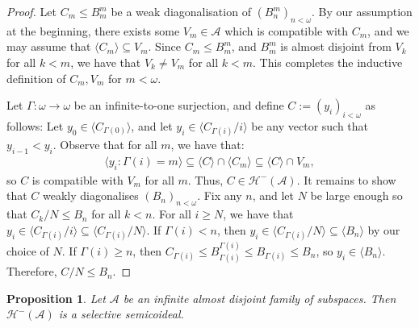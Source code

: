 \documentclass[11pt,reqno]{amsart}
\theoremstyle{plain}
\numberwithin{equation}{section}
\newtheorem{proposition}[theorem]{Proposition}
\theoremstyle{definition}
\renewcommand{\c}[1]{\langle #1 \rangle}
\newcommand{\cal}{\mathcal}
\newcommand{\A}{\cal{A}}
\renewcommand{\H}{\cal{H}}
\begin{document}
\begin{proof}
    Let $C_m \leq B_m^m$ be a weak diagonalisation of $(B_n^m)_{n<\omega}$. By our assumption at the beginning, there exists some $V_m \in \A$ which is compatible with $C_m$, and we may assume that $\c{C_m} \subseteq V_m$. Since $C_m \leq B_m^m$, and $B_m^m$ is almost disjoint from $V_k$ for all $k < m$, we have that $V_k \neq V_m$ for all $k < m$. This completes the inductive definition of $C_m,V_m$ for $m < \omega$.
    
    Let $\Gamma : \omega \to \omega$ be an infinite-to-one surjection, and define $C := (y_i)_{i<\omega}$ as follows: Let $y_0 \in \c{C_{\Gamma(0)}}$, and let $y_i \in \c{C_{\Gamma(i)}/i}$ be any vector such that $y_{i-1} < y_i$. Observe that for all $m$, we have that:
    \begin{align*}
        \c{y_i : \Gamma(i) = m} \subseteq \c{C} \cap \c{C_m} \subseteq \c{C} \cap V_m,
    \end{align*}
    so $C$ is compatible with $V_m$ for all $m$. Thus, $C \in \H^-(\A)$. It remains to show that $C$ weakly diagonalises $(B_n)_{n<\omega}$. Fix any $n$, and let $N$ be large enough so that $C_k/N \leq B_n$ for all $k < n$. For all $i \geq N$, we have that $y_i \in \c{C_{\Gamma(i)}/i} \subseteq \c{C_{\Gamma(i)}/N}$. If $\Gamma(i) < n$, then $y_i \in \c{C_{\Gamma(i)}/N} \subseteq \c{B_n}$ by our choice of $N$. If $\Gamma(i) \geq n$, then $C_{\Gamma(i)} \leq B_{\Gamma(i)}^{\Gamma(i)} \leq B_{\Gamma(i)} \leq B_n$, so $y_i \in \c{B_n}$. Therefore, $C/N \leq B_n$.
\end{proof}

\begin{proposition}
\label{prop:H^-(A).is.selective}
    Let $\A$ be an infinite almost disjoint family of subspaces. Then $\H^-(\A)$ is a selective semicoideal.
\end{proposition}
\end{document}
